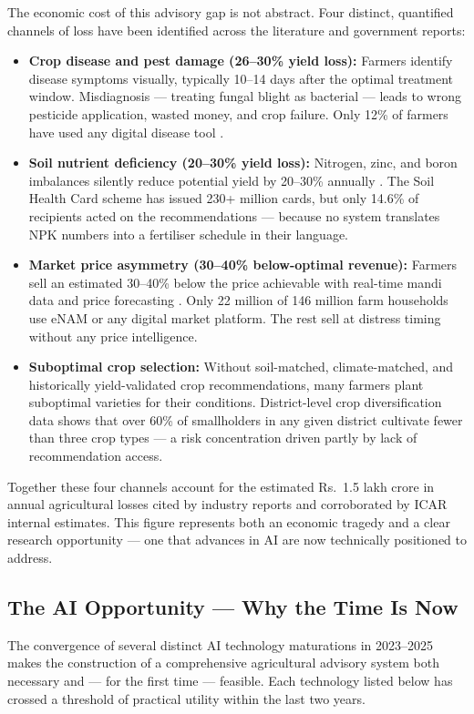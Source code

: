 \documentclass[12pt,a4paper]{article}
\providecommand{\textrupee}{Rs.~}
\begin{document}
The economic cost of this advisory gap is not abstract. Four distinct, quantified channels of loss have been identified across the literature and government reports:
\begin{itemize}
    \item \textbf{Crop disease and pest damage (26--30\% yield loss):} Farmers identify disease symptoms visually, typically 10--14 days after the optimal treatment window. Misdiagnosis --- treating fungal blight as bacterial --- leads to wrong pesticide application, wasted money, and crop failure. Only 12\% of farmers have used any digital disease tool \cite{nabard2023}.
    \item \textbf{Soil nutrient deficiency (20--30\% yield loss):} Nitrogen, zinc, and boron imbalances silently reduce potential yield by 20--30\% annually \cite{nabard2023}. The Soil Health Card scheme has issued 230+ million cards, but only 14.6\% of recipients acted on the recommendations --- because no system translates NPK numbers into a fertiliser schedule in their language.
    \item \textbf{Market price asymmetry (30--40\% below-optimal revenue):} Farmers sell an estimated 30--40\% below the price achievable with real-time mandi data and price forecasting \cite{enam2023}. Only 22 million of 146 million farm households use eNAM or any digital market platform. The rest sell at distress timing without any price intelligence.
    \item \textbf{Suboptimal crop selection:} Without soil-matched, climate-matched, and historically yield-validated crop recommendations, many farmers plant suboptimal varieties for their conditions. District-level crop diversification data shows that over 60\% of smallholders in any given district cultivate fewer than three crop types --- a risk concentration driven partly by lack of recommendation access.
\end{itemize}

Together these four channels account for the estimated \textrupee 1.5 lakh crore in annual agricultural losses cited by industry reports and corroborated by ICAR internal estimates. This figure represents both an economic tragedy and a clear research opportunity --- one that advances in AI are now technically positioned to address.

\subsection{The AI Opportunity --- Why the Time Is Now}
The convergence of several distinct AI technology maturations in 2023--2025 makes the construction of a comprehensive agricultural advisory system both necessary and --- for the first time --- feasible. Each technology listed below has crossed a threshold of practical utility within the last two years.
\end{document}

